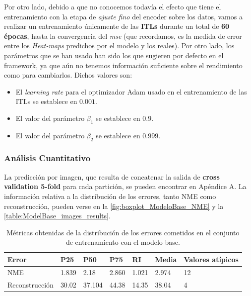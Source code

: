         \medskip

        \noindent Por otro lado, debido a que no conocemos todavía el efecto que tiene el entrenamiento con la etapa de \textit{ajuste fino} del encoder sobre los datos, vamos a realizar un entrenamiento únicamente de las \textbf{ITLs} durante un total de \textbf{60 épocas}, hasta la convergencia del \textit{mse} (que recordamos, es la medida de error entre los \textit{Heat-maps} predichos por el modelo y los reales). Por otro lado, los parámetros que se han usado han sido los que sugieren por defecto en el framework, ya que aún no tenemos información suficiente sobre el rendimiento como para cambiarlos. Dichos valores son: 

        \begin{itemize}
            \item El \textit{learning rate} para el optimizador Adam usado en el entrenamiento de las ITLs se establece en $0.001$. 
            \item El valor del parámetro $\beta_1$ se establece en $0.9$.
            \item El valor del parámetro $\beta_2$ se establece en $0.999$.
        \end{itemize}

        \subsubsection*{Análisis Cuantitativo}

        \noindent La predicción por imagen, que resulta de concatenar la salida de \textbf{cross validation 5-fold } para cada partición, se pueden encontrar en Apéndice A. La información relativa a la distribución de los errores, tanto NME como reconstrucción, pueden verse en la \autoref{fig:boxplot_ModeloBase_NME} y la \autoref{table:ModelBase_images_results}.

        \begin{table}[!ht]
            \centering
            \caption{Métricas obtenidas de la distribución de los errores cometidos en el conjunto de entrenamiento con el modelo base.}
            \begin{tabular}{|l|l|l|l|l|l|l|}
            \hline
                \cellcolor{gray!25}\textbf{Error} & \cellcolor{gray!25}\textbf{P25} & \cellcolor{gray!25}\textbf{P50} & \cellcolor{gray!25}\textbf{P75} & \cellcolor{gray!25}\textbf{RI} & \cellcolor{gray!25}\textbf{Media} & \cellcolor{gray!25}\textbf{Valores atípicos} \\ \hline
                NME & 1.839 & 2.18 & 2.860 & 1.021 & 2.974 & 12 \\ \hline
                Reconstrucción & 30.02 & 37.104 & 44.38 & 14.35 & 38.04 & 4 \\ \hline
            \end{tabular}
            \label{table:ModelBase_images_results}
        \end{table}
         
